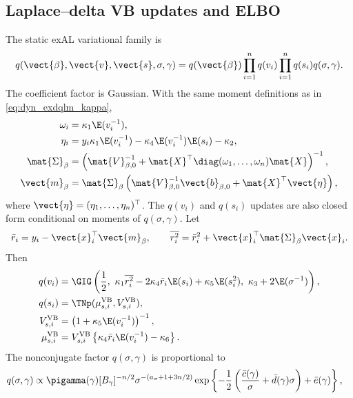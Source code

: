 \subsection{Laplace--delta VB updates and ELBO}

The static exAL variational family is
\begin{equation}
q(\vect{\beta},\vect{v},\vect{s},\sigma,\gamma)
=q(\vect{\beta})\prod_{i=1}^nq(v_i)\prod_{i=1}^nq(s_i)q(\sigma,\gamma).
\label{eq:static_exal_mf}
\end{equation}
The coefficient factor is Gaussian. With the same moment definitions as in
\eqref{eq:dyn_exdqlm_kappa},
\begin{align}
\omega_i&=\kappa_1\E(v_i^{-1}),\\
\eta_i&=
y_i\kappa_1\E(v_i^{-1})
-\kappa_4\E(v_i^{-1})\E(s_i)
-\kappa_2,\\
\mat{\Sigma}_\beta
&=\left(\mat{V}_{\beta,0}^{-1}+\mat{X}^\top\diag(\omega_1,\ldots,\omega_n)\mat{X}\right)^{-1},\\
\vect{m}_\beta
&=\mat{\Sigma}_\beta
\left(\mat{V}_{\beta,0}^{-1}\vect{b}_{\beta,0}+\mat{X}^\top\vect{\eta}\right),
\label{eq:static_exal_vb_beta}
\end{align}
where $\vect{\eta}=(\eta_1,\ldots,\eta_n)^\top$. The $q(v_i)$ and $q(s_i)$
updates are also closed form conditional on moments of $q(\sigma,\gamma)$.
Let
\begin{equation}
\bar r_i=y_i-\vect{x}_i^\top\vect{m}_\beta,\qquad
\overline{r_i^2}=\bar r_i^2+\vect{x}_i^\top\mat{\Sigma}_\beta\vect{x}_i.
\end{equation}
Then
\begin{align}
q(v_i)
&=
\GIG\left(
\frac{1}{2},\
\kappa_1\overline{r_i^2}
-2\kappa_4\bar r_i\E(s_i)
+\kappa_5\E(s_i^2),\
\kappa_3+2\E(\sigma^{-1})
\right),\\
q(s_i)&=\TNp(\mu_{s,i}^{\mathrm{VB}},V_{s,i}^{\mathrm{VB}}),\\
V_{s,i}^{\mathrm{VB}}
&=\left(1+\kappa_5\E(v_i^{-1})\right)^{-1},\\
\mu_{s,i}^{\mathrm{VB}}
&=V_{s,i}^{\mathrm{VB}}
\left\{\kappa_4\bar r_i\E(v_i^{-1})-\kappa_6\right\}.
\label{eq:static_exal_vb_vs}
\end{align}
The nonconjugate factor $q(\sigma,\gamma)$ is proportional to
\begin{align}
q(\sigma,\gamma)
&\propto
\pigamma(\gamma)[B_\gamma]^{-n/2}
\sigma^{-(a_\sigma+1+3n/2)}
\exp\left\{
-\frac{1}{2}\left(\frac{\bar c(\gamma)}{\sigma}
+\bar d(\gamma)\sigma\right)+\bar e(\gamma)
\right\},
\label{eq:static_exal_q_sigmagam}
\end{align}
